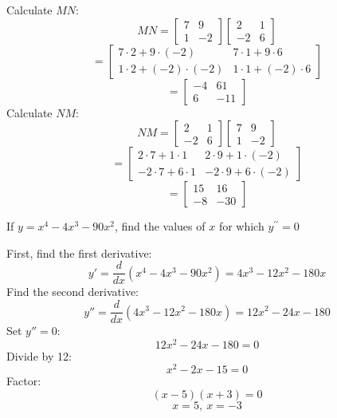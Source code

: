 \documentclass[a4paper, 12pt]{report}
\begin{document}
    Calculate \( MN \):
    \[MN = \begin{bmatrix} 7 & 9 \\ 1 & -2 \end{bmatrix} \begin{bmatrix} 2 & 1 \\ -2 & 6 \end{bmatrix}\]
    \[= \begin{bmatrix} 7 \cdot 2 + 9 \cdot (-2) & 7 \cdot 1 + 9 \cdot 6 \\ 1 \cdot 2 + (-2) \cdot (-2) & 1 \cdot 1 + (-2) \cdot 6 \end{bmatrix}\]
    \[\boxed{= \begin{bmatrix} -4 & 61 \\ 6 & -11 \end{bmatrix}}\]
    Calculate \( NM \):
    \[NM = \begin{bmatrix} 2 & 1 \\ -2 & 6 \end{bmatrix} \begin{bmatrix} 7 & 9 \\ 1 & -2 \end{bmatrix}\]
    \[= \begin{bmatrix} 2 \cdot 7 + 1 \cdot 1 & 2 \cdot 9 + 1 \cdot (-2) \\ -2 \cdot 7 + 6 \cdot 1 & -2 \cdot 9 + 6 \cdot (-2) \end{bmatrix}\]
    \[\boxed{= \begin{bmatrix} 15 & 16 \\ -8 & -30 \end{bmatrix}}\]
    
    \newpage
    \begin{tcolorbox}[title=\color{black}{\section{Q9}}, colback=white, colframe=black!30!white, boxrule=0.4mm, width=1\textwidth]
        If \( y=x^{4}-4 x^{3}-90 x^{2} \), find the values of \( x \) for which \( y^{\prime \prime}=0 \)
    \end{tcolorbox}
    
    First, find the first derivative:
    \[y' = \frac{d}{dx}(x^4 - 4x^3 - 90x^2) = 4x^3 - 12x^2 - 180x\]
    Find the second derivative:
    \[y'' = \frac{d}{dx}(4x^3 - 12x^2 - 180x) = 12x^2 - 24x - 180\]
    Set \( y'' = 0 \):
    \[12x^2 - 24x - 180 = 0\]
    Divide by 12:
    \[x^2 - 2x - 15 = 0\]
    Factor:
    \[(x - 5)(x + 3) = 0\]
    \[\boxed{x = 5,\ x = -3}\]
    
\end{document}
